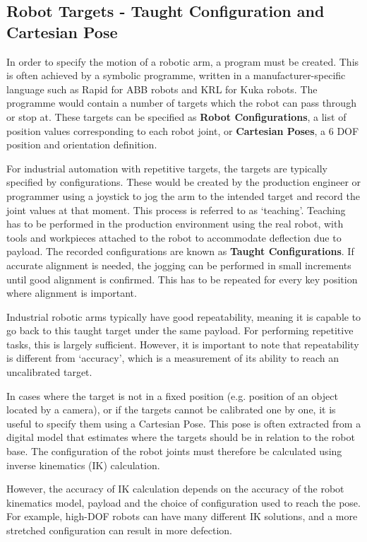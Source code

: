 \subsection{Robot Targets - Taught Configuration and Cartesian Pose}

In order to specify the motion of a robotic arm, a program must be created. This is often achieved by a symbolic programme, written in a manufacturer-specific language such as Rapid for ABB robots and KRL for Kuka robots. The programme would contain a number of targets which the robot can pass through or stop at. These targets can be specified as \textbf{Robot Configurations}, a list of position values corresponding to each robot joint, or \textbf{Cartesian Poses}, a 6 DOF position and orientation definition.

For industrial automation with repetitive targets, the targets are typically specified by configurations. These would be created by the production engineer or programmer using a joystick to jog the arm to the intended target and record the joint values at that moment. This process is referred to as ‘teaching’. Teaching has to be performed in the production environment using the real robot, with tools and workpieces attached to the robot to accommodate deflection due to payload. The recorded configurations are known as \textbf{Taught Configurations}. If accurate alignment is needed, the jogging can be performed in small increments until good alignment is confirmed. This has to be repeated for every key position where alignment is important. 

Industrial robotic arms typically have good repeatability, meaning it is capable to go back to this taught target under the same payload. For performing repetitive tasks, this is largely sufficient. However, it is important to note that repeatability is different from ‘accuracy’, which is a measurement of its ability to reach an uncalibrated target. 

In cases where the target is not in a fixed position (e.g. position of an object located by a camera), or if the targets cannot be calibrated one by one, it is useful to specify them using a Cartesian Pose. This pose is often extracted from a digital model that estimates where the targets should be in relation to the robot base. The configuration of the robot joints must therefore be calculated using inverse kinematics (IK) calculation. 

However, the accuracy of IK calculation depends on the accuracy of the robot kinematics model, payload and the choice of configuration used to reach the pose. For example, high-DOF robots can have many different IK solutions, and a more stretched configuration can result in more defection. 

